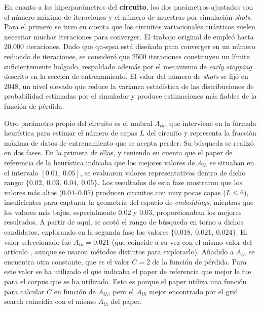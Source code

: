 En cuanto a los hiperparámetros del \textbf{circuito}, los dos parámetros ajustados son el número máximo de iteraciones y el número de muestras por simulación \textit{shots}. Para el primero se tuvo en cuenta que los circuitos variacionales cuánticos suelen necesitar muchas iteraciones para converger. El trabajo original de \cite{ohno_qword2vec_2025} empleó hasta 20.000 iteraciones. Dado que \gls{qn-spsa} está diseñado para converger en un número reducido de iteraciones, se consideró que 2500 iteraciones constituyen un límite suficientemente holgado, respaldado además por el mecanismo de \textit{early stopping} descrito en la sección de entrenamiento. El valor del número de \textit{shots} se fijó en 2048, un nivel elevado que reduce la varianza estadística de las distribuciones de probabilidad estimadas por el simulador y produce estimaciones más fiables de la función de pérdida.

Otro parámetro propio del circuito es el umbral $A_{th}$, que interviene en la fórmula heurística para estimar el número de capas $L$ del circuito y representa la fracción máxima de datos de entrenamiento que se acepta perder. Su búsqueda se realizó en dos fases. En la primera de ellas, y teniendo en cuenta que el paper de referencia de la heurística indicaba que los mejores valores de $A_{th}$ se situaban en el intervalo $[0.01,\ 0.05]$, se evaluaron valores representativos dentro de dicho rango: $\{0.02,\ 0.03,\ 0.04,\ 0.05\}$. Los resultados de esta fase mostraron que los valores más altos ($0.04$--$0.05$) producen circuitos con muy pocas capas ($L \leq 6$), insuficientes para capturar la geometría del espacio de \textit{embeddings}, mientras que los valores más bajos, especialmente $0.02$ y $0.03$, proporcionaban los mejores resultados. A partir de aquí, se acotó el rango de búsqueda en torno a dichos candidatos, explorando en la segunda fase los valores $\{0.018,\ 0.021,\ 0.024\}$. El valor seleccionado fue $A_{th} = 0.021$ (que coincide a su vez con el mismo valor del artículo \cite{ohno_qword2vec_2025}, aunque se usaron métodos distintos para explorarlo). Añadido a $A_{th}$ se encuentra otra constante, que es el valor $C = 2$ de la función de pérdida. Para este valor se ha utilizado el que indicaba el paper de referencia que mejor le fue para el corpus que se ha utilizado. Esto es porque el paper utiliza una función para calcular $C$ en función de $A_{th}$, pero el $A_{th}$ mejor encontrado por el grid search coincidía con el mismo $A_{th}$ del paper.

